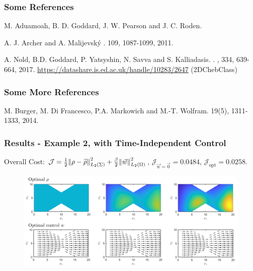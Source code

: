 \documentclass[aspectratio=169,xcolor=dvipsnames]{beamer}
\begin{document}
\appendix




\begin{frame}
\frametitle{Some References}    
\begin{thebibliography}{10}    

	M. Aduamoah, B. D. Goddard, J. W. Pearson and J. C. Roden.
	
	A. J.   Archer  and  A.  Malijevský . 
	 109, 1087-1099, 2011. 
	
	A. Nold, B.D. Goddard, P. Yatsyshin, N. Savva and S. Kalliadasis. 
	.
	, 334, 639-664, 2017.
	\newblock \url{https://datashare.is.ed.ac.uk/handle/10283/2647} (2DChebClass)
		
\end{thebibliography}
\end{frame}
\begin{frame}
\frametitle{Some More References}    
\begin{thebibliography}{10}    
	
	
	M. Burger, M. Di Francesco, P.A. Markowich and  M.-T. Wolfram. 
	 19(5), 1311-1333, 2014. 	

	
\end{thebibliography}
\end{frame}


\begin{frame}
	\frametitle{Results - Example 2, with Time-Independent Control}
	\vspace{0.3cm}
	Overall Cost: $\mathcal J = \frac{1}{2}\norm{\rho- \widehat{\rho}}_{L_2(\Sigma)}^2 + \frac{\beta}{2} \norm{\vec{w}}_{L_2(\Omega)}^2$, $\mathcal J_{\vec{w} = \vec 0} = 0.0484$, $\mathcal J_{\text{opt}} = 0.0258$.
	\begin{figure}
		\includegraphics[width=14cm]{ExRes2b2.png}
	\end{figure}
\end{frame}
\end{document}
